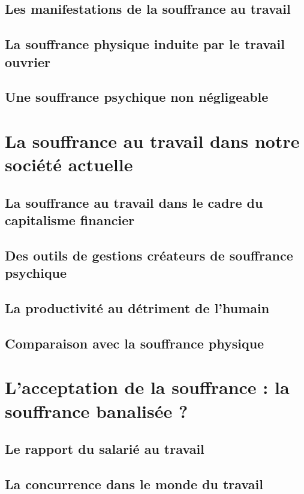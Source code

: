 \documentclass{report}
\begin{document}
	\section{Les manifestations de la souffrance au travail}

	\section{La souffrance physique induite par le travail ouvrier}

	\section{Une souffrance psychique non négligeable}

\chapter{La souffrance au travail dans notre société actuelle}
	\section{La souffrance au travail dans le cadre du capitalisme financier}

	\section{Des outils de gestions créateurs de souffrance psychique}

	\section{La productivité au détriment de l'humain}

	\section{Comparaison avec la souffrance physique}

\chapter{L’acceptation de la souffrance : la souffrance banalisée ?}
	\section{Le rapport du salarié au travail}

	\section{La concurrence dans le monde du travail}
\end{document}
